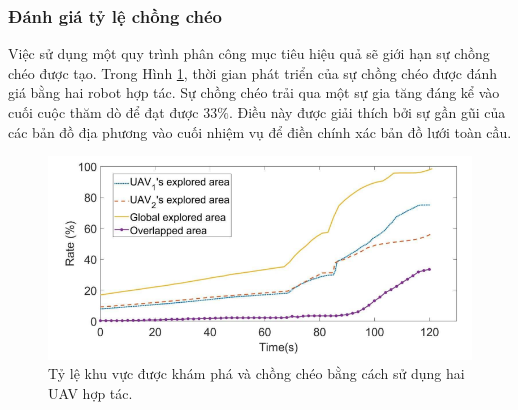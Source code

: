\documentclass[11pt,openany]{book}
\begin{document}
\subsubsection{Đánh giá tỷ lệ chồng chéo}
Việc sử dụng một quy trình phân công mục tiêu hiệu quả sẽ giới hạn sự chồng chéo được tạo. Trong Hình \ref{fig:3.19}, thời gian phát triển của sự chồng chéo được đánh giá bằng hai robot hợp tác. Sự chồng chéo trải qua một sự gia tăng đáng kể vào cuối cuộc thăm dò để đạt được $33\%$. Điều này được giải thích bởi sự gần gũi của các bản đồ địa phương vào cuối nhiệm vụ để điền chính xác bản đồ lưới toàn cầu.
\begin{figure}[H]
    \centering
    \includegraphics[scale=0.4]{assets/3_19.png}
    \caption{Tỷ lệ khu vực được khám phá và chồng chéo bằng cách sử dụng hai UAV hợp tác.}
    \label{fig:3.19}
\end{figure}
\end{document}

